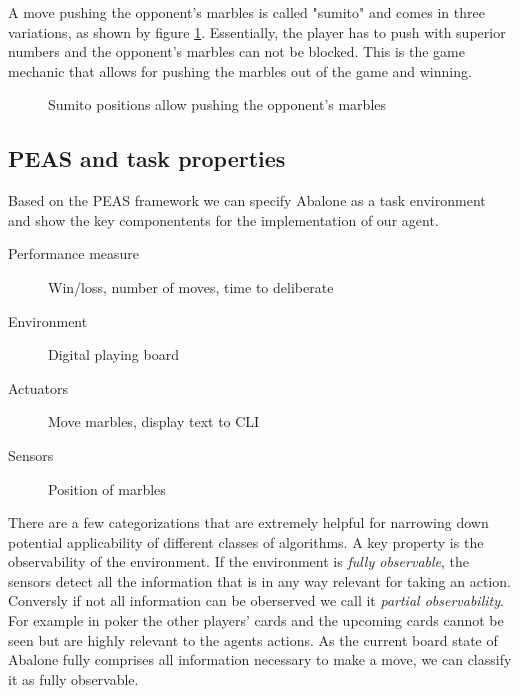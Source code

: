 A move pushing the opponent's marbles is called "sumito" and comes in three variations, as shown by figure \ref{sumito}. Essentially, the player has to push with superior numbers and the opponent's marbles can not be blocked. This is the game mechanic that allows for pushing the marbles out of the game and winning.

\begin{figure}[!h]
    \centering
    \hfill
    \hfill
    \caption{Sumito positions allow pushing the opponent's marbles \cite{abalone_sa_abalone_nodate}}
    \label{sumito}
\end{figure}

\subsection{PEAS and task properties}
Based on the PEAS framework we can specify Abalone as a task environment and show the key componentents for the implementation of our agent. \cite[p.107]{russell_artificial_2021}

\begin{description}
    \item[Performance measure] Win/loss, number of moves, time to deliberate
    \item[Environment] Digital playing board
    \item[Actuators] Move marbles, display text to CLI
    \item[Sensors] Position of marbles
\end{description}

There are a few categorizations that are extremely helpful for narrowing down potential applicability of different classes of algorithms. A key property is the observability of the environment. If the environment is \textit{fully observable}, the sensors detect all the information that is in any way relevant for taking an action. Conversly if not all information can be oberserved we call it \textit{partial observability}. For example in poker the other players' cards and the upcoming cards cannot be seen but are highly relevant to the agents actions. As the current board state of Abalone fully comprises all information necessary to make a move, we can classify it as fully observable.

